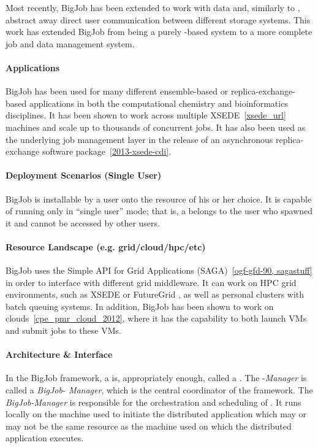 \documentclass{sig-alternate}
\begin{document}
Most recently, BigJob has been extended to work with data and, similarly to
\pilotjobs, abstract away direct user communication between different
storage systems. This work has extended BigJob from being a purely
\pilotjob-based system to a more complete job and data management
system.

\paragraph{Applications}
BigJob has been used for many different ensemble-based or
replica-exchange-based applications in both the computational chemistry
and bioinformatics disciplines. It has been shown to work across multiple
XSEDE~\ref{xsede_url} machines and scale up to thousands of concurrent
jobs. It has also been used as the underlying job
management layer in the release of an asynchronous replica-exchange
software package~\ref{2013-xsede-cdi}.

\paragraph{Deployment Scenarios (Single User)}
BigJob is installable by a user onto the resource of his or her choice. It is capable of
running only in ``single user'' mode; that is, a \pilot belongs to the user who
spawned it and cannot be accessed by other users.

\paragraph{Resource Landscape (e.g. grid/cloud/hpc/etc)}
BigJob uses the Simple API for Grid Applications (SAGA)~\ref{ogf-gfd-90, sagastuff}
in order to interface with different grid middleware. It can work on HPC grid
environments, such as XSEDE or FutureGrid , as well as personal
clusters with batch queuing systems. In addition, BigJob has been shown to work
on clouds~\ref{cpe_pmr_cloud_2012}, where it has the capability to both
launch VMs and submit jobs to these VMs.

\paragraph{Architecture \& Interface}

In the BigJob framework, a \pilot is, appropriately enough, called a
\pilot. The \pilot-\textit{Manager} is called a \textit{BigJob-
Manager}, which is the central coordinator of the
framework. The \textit{BigJob-Manager} is responsible for
the orchestration and scheduling of \pilots. It runs locally on the
machine used to initiate the distributed application which may or may
not be the same resource as the machine used on which the distributed
application executes.
\end{document}
